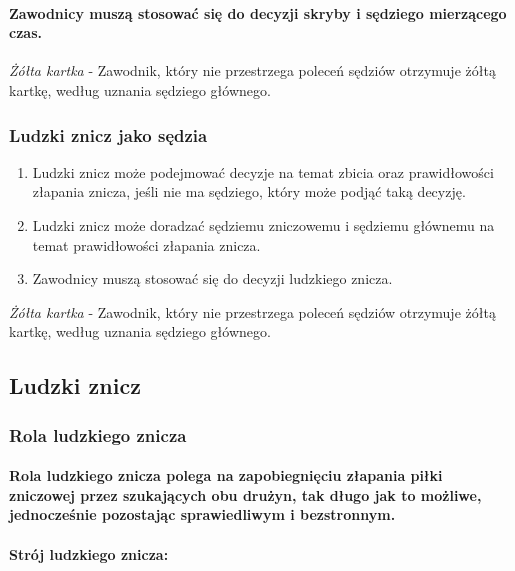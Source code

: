 \documentclass[12pt]{article}
\begin{document}
\paragraph{Zawodnicy muszą stosować się do decyzji skryby i
sędziego mierzącego czas.}

\emph{Żółta kartka} - Zawodnik, który nie przestrzega poleceń sędziów
otrzymuje żółtą kartkę, według uznania sędziego głównego.

\subsubsection{Ludzki znicz jako sędzia}

\begin{enumerate}
\item Ludzki znicz może podejmować decyzje na temat zbicia oraz
prawidłowości złapania znicza, jeśli nie ma sędziego, który może podjąć
taką decyzję.

\item Ludzki znicz może doradzać sędziemu zniczowemu i sędziemu głównemu na
temat prawidłowości złapania znicza.

\item Zawodnicy muszą stosować się do decyzji ludzkiego znicza.
\end{enumerate}

\emph{Żółta kartka} - Zawodnik, który nie przestrzega poleceń sędziów
otrzymuje żółtą kartkę, według uznania sędziego głównego.

\subsection{Ludzki znicz}

\subsubsection{Rola ludzkiego znicza}

\paragraph{Rola ludzkiego znicza polega na zapobiegnięciu
złapania piłki zniczowej przez szukających obu drużyn, tak długo jak to
możliwe, jednocześnie pozostając sprawiedliwym i bezstronnym.}

\paragraph{Strój ludzkiego znicza:}
\end{document}
